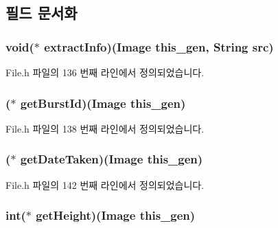 \subsection{필드 문서화}
\hypertarget{struct___image_ab6c9b3a1c46d72f02fd0197b3d154b75}{
\subsubsection[{extract\-Info}]{\setlength{\rightskip}{0pt plus 5cm}void($\ast$  extract\-Info)({\bf Image} this\-\_\-gen, {\bf String} src)}}\label{struct___image_ab6c9b3a1c46d72f02fd0197b3d154b75}


File.\-h 파일의 136 번째 라인에서 정의되었습니다.

\hypertarget{struct___image_a43ccbbf065326a2647887464f16b7373}{
\subsubsection[{get\-Burst\-Id}]{($\ast$  get\-Burst\-Id)({\bf Image} this\-\_\-gen)}}\label{struct___image_a43ccbbf065326a2647887464f16b7373}


File.\-h 파일의 138 번째 라인에서 정의되었습니다.

\hypertarget{struct___image_a170cc9a88ad9e65b2d8725d1370bc946}{
\subsubsection[{get\-Date\-Taken}]{($\ast$  get\-Date\-Taken)({\bf Image} this\-\_\-gen)}}\label{struct___image_a170cc9a88ad9e65b2d8725d1370bc946}


File.\-h 파일의 142 번째 라인에서 정의되었습니다.

\hypertarget{struct___image_a8958794ba1906035ca256305dc103399}{
\subsubsection[{get\-Height}]{\setlength{\rightskip}{0pt plus 5cm}int($\ast$  get\-Height)({\bf Image} this\-\_\-gen)}}\label{struct___image_a8958794ba1906035ca256305dc103399}



